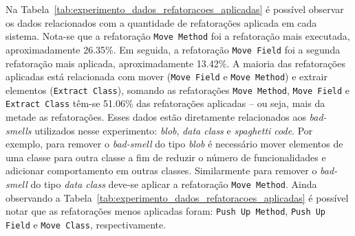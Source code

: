 Na Tabela~\ref{tab:experimento_dados_refatoracoes_aplicadas} é possível observar os dados relacionados com a quantidade de refatorações aplicada em cada sistema. Nota-se que a refatoração \texttt{Move Method} foi a refatoração mais executada, aproximadamente 26.35\%.  Em seguida, a refatoração \texttt{Move Field} foi a segunda refatoração mais aplicada, aproximadamente 13.42\%. A maioria das refatorações aplicadas está relacionada com mover (\texttt{Move Field} e \texttt{Move Method}) e extrair elementos (\texttt{Extract Class}), somando as refatorações \texttt{Move Method}, \texttt{Move Field} e \texttt{Extract Class} têm-se 51.06\% das refatorações aplicadas – ou seja, mais da metade as refatorações. Esses dados estão diretamente relacionados aos \textit{bad-smells} utilizados nesse experimento: \textit{blob}, \textit{data class} e \textit{spaghetti code}. Por exemplo, para remover o \textit{bad-smell} do tipo \textit{blob} é necessário mover elementos de uma classe para outra classe a fim de reduzir o número de funcionalidades e adicionar comportamento em outras classes. Similarmente para remover o \textit{bad-smell} do tipo \textit{data class} deve-se aplicar a refatoração \texttt{Move Method}. Ainda observando a Tabela~\ref{tab:experimento_dados_refatoracoes_aplicadas} é possível notar que as refatorações menos aplicadas foram: \texttt{Push Up Method}, \texttt{Push Up Field} e \texttt{Move Class}, respectivamente. 

